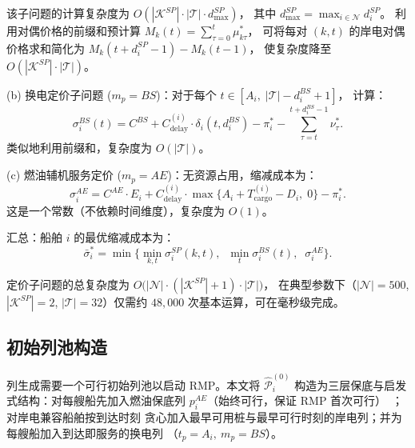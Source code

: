 \documentclass[UTF8, a4paper, 12pt]{ctexart}
\theoremstyle{plain}
\theoremstyle{definition}
\theoremstyle{remark}
\begin{document}
\noindent
该子问题的计算复杂度为 $O(|\mathcal{K}^{SP}| \cdot |\mathcal{T}| \cdot d_{\max}^{SP})$，
其中 $d_{\max}^{SP}=\max_{i \in \mathcal{N}} d_i^{SP}$。
利用对偶价格的前缀和预计算
$M_{k}(t) = \sum_{\tau=0}^{t} \mu_{k\tau}^*$，
可将每对 $(k, t)$ 的岸电对偶价格求和简化为
$M_{k}(t + d_i^{SP} - 1) - M_{k}(t - 1)$，
使复杂度降至 $O(|\mathcal{K}^{SP}| \cdot |\mathcal{T}|)$。

\medskip
\noindent(b) 换电定价子问题
($m_p = BS$)：对于每个 $t \in [A_i,\; |\mathcal{T}| - d_i^{BS} + 1]$，
计算：
\begin{equation}
  \sigma_i^{BS}(t)
  = C^{BS} + C_{\text{delay}}^{(i)} \cdot \delta_i(t, d_i^{BS})
  - \pi_i^*
  - \sum_{\tau = t}^{t + d_i^{BS} - 1} \nu_{\tau}^*.
  \label{eq:price_bs}
\end{equation}
类似地利用前缀和，复杂度为 $O(|\mathcal{T}|)$。

\medskip
\noindent(c) 燃油辅机服务定价
($m_p = AE$)：无资源占用，缩减成本为：
\begin{equation}
  \sigma_i^{AE}
  = C^{AE} \cdot E_i
  + C_{\text{delay}}^{(i)} \cdot \max\!\big\{A_i + T_{\text{cargo}}^{(i)} - D_i,\; 0\big\}
  - \pi_i^*.
  \label{eq:price_ae}
\end{equation}
这是一个常数（不依赖时间维度），复杂度为 $O(1)$。

\medskip
\noindent 汇总：船舶 $i$ 的最优缩减成本为：
\begin{equation}
  \bar{\sigma}_i^* = \min\!\Big\{
    \min_{k,t} \sigma_i^{SP}(k,t),\;\;
    \min_{t} \sigma_i^{BS}(t),\;\;
    \sigma_i^{AE}
  \Big\}.
  \label{eq:price_min}
\end{equation}

\noindent
定价子问题的总复杂度为
$O\!\big(|\mathcal{N}| \cdot (|\mathcal{K}^{SP}| + 1) \cdot |\mathcal{T}|\big)$，
在典型参数下（$|\mathcal{N}| = 500$, $|\mathcal{K}^{SP}| = 2$,
$|\mathcal{T}| = 32$）仅需约 $48{,}000$ 次基本运算，可在毫秒级完成。

\subsection{初始列池构造}
\label{sec:cg_init}

列生成需要一个可行初始列池以启动 RMP。本文将
$\hat{\mathcal{P}}_i^{(0)}$ 构造为三层保底与启发式结构：对每艘船先加入燃油保底列
$p_i^{AE}$（始终可行，保证 RMP 首次可行）~\cite{Cordeau2015}；对岸电兼容船舶按到达时刻
贪心加入最早可用桩与最早可行时刻的岸电列；并为每艘船加入到达即服务的换电列
（$t_p=A_i,\ m_p=BS$）。
\end{document}
